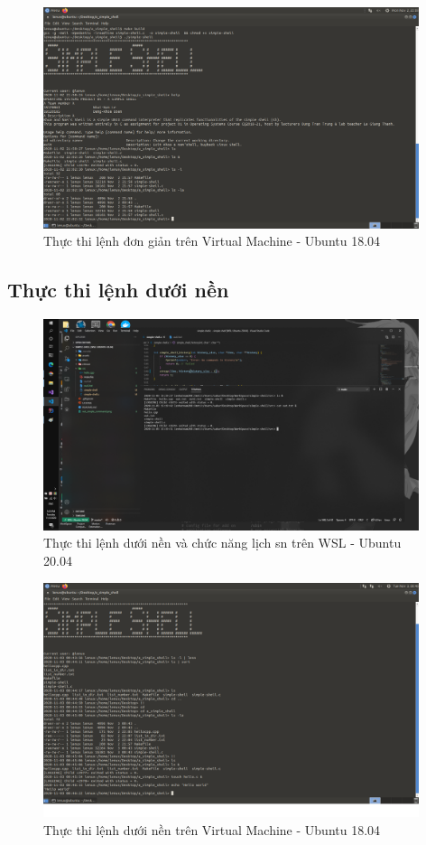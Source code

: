 \documentclass{article}
\begin{document}
\begin{figure}[H]
\centering
\includegraphics[width=0.98\textwidth]{virtual_machine_executing_command_in_child_process.png}
\caption{Thực thi lệnh đơn giản trên Virtual Machine - Ubuntu 18.04}
\end{figure}

\subsection{Thực thi lệnh dưới nền}

\begin{figure}[H]
\centering
\includegraphics[width=0.98\textwidth]{wsl_simple_command_background.png}
\caption{Thực thi lệnh dưới nền và chức năng lịch sn trên WSL - Ubuntu 20.04}
\end{figure}

\begin{figure}[H]
\centering
\includegraphics[width=0.98\textwidth]{virtual_machine_background.png}
\caption{Thực thi lệnh dưới nền trên Virtual Machine - Ubuntu 18.04}
\end{figure}
\end{document}
